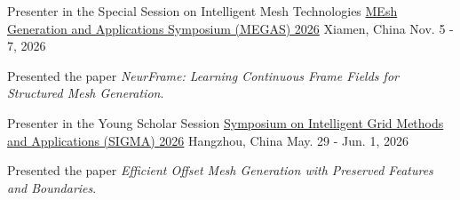 

\begin{cventries}

  \cventry
    {Presenter in the Special Session on Intelligent Mesh Technologies} %
    {\href{https://graphics.xmu.edu.cn/MEGAS2026/index.html}{MEsh Generation and Applications Symposium (MEGAS) 2026}} %
    {Xiamen, China} %
    {Nov. 5 - 7, 2026} %
    {
      \begin{cvitems} %
        \item {Presented the paper \emph{NeurFrame: Learning Continuous Frame Fields for Structured Mesh Generation}.}
      \end{cvitems}
    }

  \cventry
    {Presenter in the Young Scholar Session} %
    {\href{https://mp.weixin.qq.com/s/rh_EoJRCUe0eg0RSsuWNpw}{Symposium on Intelligent Grid Methods and Applications (SIGMA) 2026}} %
    {Hangzhou, China} %
    {May. 29 - Jun. 1, 2026} %
    {
      \begin{cvitems} %
        \item {Presented the paper \emph{Efficient Offset Mesh Generation with Preserved Features and Boundaries}.}
      \end{cvitems}
    }
\end{cventries}
